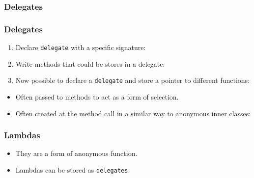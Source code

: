 \documentclass{beamer}
\begin{document}
\subsubsection{Delegates}
\begin{frame}[allowframebreaks]
\frametitle{Delegates}
\begin{enumerate}
\item Declare \texttt{delegate} with a specific signature:
\delo
\item Write methods that could be stores in a delegate:
\delt
\item Now possible to declare a \texttt{delegate} and store a pointer to different functions:
\delth
\end{enumerate}
\begin{itemize}
\item Often passed to methods to act as a form of selection.
\item Often created at the method call in a similar way to anonymous inner classes:	
\exam
\end{itemize}
\end{frame}
\subsubsection{Lambdas}
\begin{frame}
\begin{itemize}
\item They are a form of anonymous function.
\lam
\item Lambdas can be stored as \texttt{delegates}:
\lamt
\end{itemize}
\end{frame}
\end{document}
